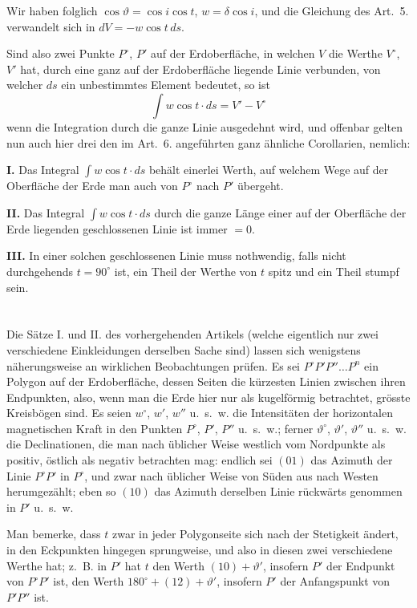 \documentclass[fontsize=11pt,paper=a4,twoside,openany]{scrbook}
\begin{document}
Wir haben folglich $\cos\vartheta=\cos i\cos t$, $w=\delta\cos i$, und die Gleichung des Art.~5. verwandelt sich in $dV=-w\cos t\,ds$.

Sind also zwei Punkte $P^{\circ}$, $P'$ auf der Erdoberfläche, in welchen $V$ die Werthe $V^{\circ}$, $V'$ hat, durch eine ganz auf der Erdoberfläche liegende Linie verbunden, von welcher $ds$ ein unbestimmtes Element bedeutet, so ist
\[
\int w\cos t\cdot ds = V' - V^{\circ}
\]
wenn die Integration durch die ganze Linie ausgedehnt wird, und offenbar gelten nun auch hier drei den im Art.~6. angeführten ganz ähnliche Corollarien, nemlich:

\textbf{I.} Das Integral $\int w\cos t\cdot ds$ behält einerlei Werth, auf welchem Wege auf der Oberfläche der Erde man auch von $P^{\circ}$ nach $P'$ übergeht.

\textbf{II.} Das Integral $\int w\cos t\cdot ds$ durch die ganze Länge einer auf der Oberfläche der Erde liegenden geschlossenen Linie ist immer $=0$.

\textbf{III.} In einer solchen geschlossenen Linie muss nothwendig, falls nicht durchgehends $t=90^{\circ}$ ist, ein Theil der Werthe von $t$ spitz und ein Theil stumpf sein.

\section{}

Die Sätze I. und II. des vorhergehenden Artikels (welche eigentlich nur zwei verschiedene Einkleidungen derselben Sache sind) lassen sich wenigstens näherungsweise an wirklichen Beobachtungen prüfen. Es sei $P^{\circ}P'P''\ldots P^{n}$ ein Polygon auf der Erdoberfläche, dessen Seiten die kürzesten Linien zwischen ihren Endpunkten, also, wenn man die Erde hier nur als kugelförmig betrachtet, grösste Kreisbögen sind. Es seien $w^{\circ}$, $w'$, $w''$ u.~s.~w. die Intensitäten der horizontalen magnetischen Kraft in den Punkten $P^{\circ}$, $P'$, $P''$ u.~s.~w.; ferner $\vartheta^{\circ}$, $\vartheta'$, $\vartheta''$ u.~s.~w. die Declinationen, die man nach üblicher Weise westlich vom Nordpunkte als positiv, östlich als negativ betrachten mag: endlich sei $(01)$ das Azimuth der Linie $P^{\circ}P'$ in $P^{\circ}$, und zwar nach üblicher Weise von Süden aus nach Westen herumgezählt; eben so $(10)$ das Azimuth derselben Linie rückwärts genommen in $P'$ u.~s.~w.

Man bemerke, dass $t$ zwar in jeder Polygonseite sich nach der Stetigkeit ändert, in den Eckpunkten hingegen sprungweise, und also in diesen zwei verschiedene Werthe hat; z.~B. in $P'$ hat $t$ den Werth $(10)+\vartheta'$, insofern $P'$ der Endpunkt von $P^{\circ}P'$ ist, den Werth $180^{\circ}+(12)+\vartheta'$, insofern $P'$ der Anfangspunkt von $P'P''$ ist.
\end{document}
